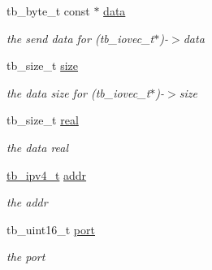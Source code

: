 \begin{DoxyCompactItemize}
\item 
\hypertarget{structtb__aice__usend__t_a0f06317cb9b61ea27e48021119243d9b}{tb\-\_\-byte\-\_\-t const $\ast$ \hyperlink{structtb__aice__usend__t_a0f06317cb9b61ea27e48021119243d9b}{data}}\label{structtb__aice__usend__t_a0f06317cb9b61ea27e48021119243d9b}

\begin{DoxyCompactList}\small\item\em the send data for (tb\-\_\-iovec\-\_\-t$\ast$)-\/$>$data \end{DoxyCompactList}\item 
\hypertarget{structtb__aice__usend__t_a9a99f7ebec0f68eb9da358d26823c42b}{tb\-\_\-size\-\_\-t \hyperlink{structtb__aice__usend__t_a9a99f7ebec0f68eb9da358d26823c42b}{size}}\label{structtb__aice__usend__t_a9a99f7ebec0f68eb9da358d26823c42b}

\begin{DoxyCompactList}\small\item\em the data size for (tb\-\_\-iovec\-\_\-t$\ast$)-\/$>$size \end{DoxyCompactList}\item 
\hypertarget{structtb__aice__usend__t_ad33a3692b25b842990abd3329afdf0d8}{tb\-\_\-size\-\_\-t \hyperlink{structtb__aice__usend__t_ad33a3692b25b842990abd3329afdf0d8}{real}}\label{structtb__aice__usend__t_ad33a3692b25b842990abd3329afdf0d8}

\begin{DoxyCompactList}\small\item\em the data real \end{DoxyCompactList}\item 
\hypertarget{structtb__aice__usend__t_a1cc587aae663f0176df76f929c624974}{\hyperlink{uniontb__ipv4__t}{tb\-\_\-ipv4\-\_\-t} \hyperlink{structtb__aice__usend__t_a1cc587aae663f0176df76f929c624974}{addr}}\label{structtb__aice__usend__t_a1cc587aae663f0176df76f929c624974}

\begin{DoxyCompactList}\small\item\em the addr \end{DoxyCompactList}\item 
\hypertarget{structtb__aice__usend__t_a05948b8412b9175c66573cb419cf7e84}{tb\-\_\-uint16\-\_\-t \hyperlink{structtb__aice__usend__t_a05948b8412b9175c66573cb419cf7e84}{port}}\label{structtb__aice__usend__t_a05948b8412b9175c66573cb419cf7e84}

\begin{DoxyCompactList}\small\item\em the port \end{DoxyCompactList}\end{DoxyCompactItemize}


